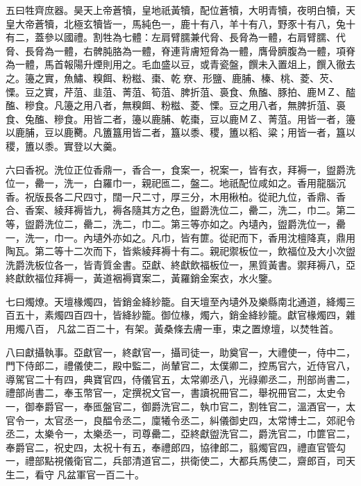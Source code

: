 \begin{pinyinscope}
 五曰牲齊庶器。昊天上帝蒼犢，皇地祇黃犢，配位蒼犢，大明青犢，夜明白犢，天皇大帝蒼犢，北極玄犢皆一，馬純色一，鹿十有八，羊十有八，野豕十有八，兔十有二，蓋參以國禮。割牲為七體：左肩臂臑兼代脅、長脅為一體，右肩臂臑、代脅、長脅為一體，右髀肫胳為一體，脊連背膚短脅為一體，膺骨臍腹為一體，項脊為一體，馬首報陽升煙則用之。毛血盛以豆，或青瓷盤，饌未入置俎上，饌入徹去之。籩之實，魚鱐、糗餌、粉糍、棗、乾尞、形鹽、鹿脯、榛、桃、菱、芡、慄。豆之實，芹菹、韭菹、菁菹、筍菹、脾折菹、裛食、魚醢、豚拍、鹿ＭＺ、醓醢、糝食。凡籩之用八者，無糗餌、粉糍、菱、慄。豆之用八者，無脾折菹、裛食、兔醢、糝食。用皆二者，籩以鹿脯、乾棗，豆以鹿ＭＺ、菁菹。用皆一者，籩以鹿脯，豆以鹿臡。凡簠簋用皆二者，簋以黍、稷，簠以稻、粱；用皆一者，簋以稷，簠以黍。實登以大羹。



 六曰香祝。洗位正位香鼎一，香合一，食案一，祝案一，皆有衣，拜褥一，盥爵洗位一，罍一，洗一，白羅巾一，親祀匜二，盤二。地祇配位咸如之。香用龍腦沉香。祝版長各二尺四寸，闊一尺二寸，厚三分，木用楸柏。從祀九位，香鼎、香合、香案、綾拜褥皆九，褥各隨其方之色，盥爵洗位二，罍二，洗二，巾二。第二等，盥爵洗位二，罍二，洗二，巾二。第三等亦如之。內壝內，盥爵洗位一，罍一，洗一，巾一。內壝外亦如之。凡巾，皆有篚。從祀而下，香用沈檀降真，鼎用陶瓦。第二等十二次而下，皆紫綾拜褥十有二。親祀禦板位一，飲福位及大小次盥洗爵洗板位各一，皆青質金書。亞獻、終獻飲福板位一，黑質黃書。禦拜褥八，亞終獻飲福位拜褥一，黃道裀褥寶案二，黃羅銷金案衣，水火鑒。



 七曰燭燎。天壇椽燭四，皆銷金絳紗籠。自天壇至內壝外及樂縣南北通道，絳燭三百五十，素燭四百四十，皆絳紗籠。御位椽，燭六，銷金絳紗籠。獻官椽燭四，雜用燭八百，凡盆二百二十，有架。黃桑條去膚一車，束之置燎壇，以焚牲首。



 八曰獻攝執事。亞獻官一，終獻官一，攝司徒一，助奠官一，大禮使一，侍中二，門下侍郎二，禮儀使二，殿中監二，尚輦官二，太僕卿二，控馬官六，近侍官八，導駕官二十有四，典寶官四，侍儀官五，太常卿丞八，光祿卿丞二，刑部尚書二，禮部尚書二，奉玉幣官一，定撰祝文官一，書讀祝冊官二，舉祝冊官二，太史令一，御奉爵官一，奉匜盤官二，御爵洗官二，執巾官二，割牲官二，溫酒官一，太官令一，太官丞一，良醖令丞二，廩犧令丞二，糾儀御史四，太常博士二，郊祀令丞二，太樂令一，太樂丞一，司尊罍二，亞終獻盥洗官二，爵洗官二，巾篚官二，奉爵官二，祝史四，太祝十有五，奉禮郎四，協律郎二，翦燭官四，禮直官管勾一，禮部點視儀衛官二，兵部清道官二，拱衛使二，大都兵馬使二，齋郎百，司天生二，看守凡盆軍官一百二十。



\end{pinyinscope}